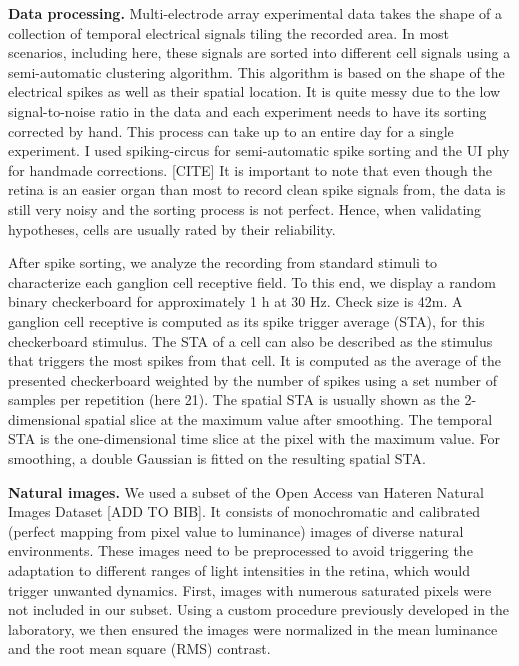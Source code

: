 \textbf{Data processing.}
Multi-electrode array experimental data takes the shape of a collection of
temporal electrical signals tiling the recorded area.
In most scenarios, including here, these signals are sorted into different cell
signals using a semi-automatic clustering algorithm. This algorithm is based on
the shape
of the electrical spikes as well as their spatial location. It is
quite messy due to the low signal-to-noise ratio in the data and each
experiment needs to have its sorting corrected by hand.
This process can take up to an
entire day for a single experiment. I used spiking-circus for semi-automatic
spike sorting and the UI phy for handmade corrections. [CITE]
It is important to note that even though the retina is an easier organ than
most to record clean spike signals from, the data is still very noisy and the
sorting process is not perfect. Hence, when validating hypotheses, cells are
usually rated by their reliability.

After spike sorting, we analyze the recording from standard stimuli to
characterize each
ganglion cell receptive field. To this end, we display a random binary
checkerboard for approximately 1 h at 30 Hz. Check size is 42\textmu m. A
ganglion cell receptive is computed as its spike trigger average (STA), for
this checkerboard stimulus. The STA of a cell can also be described as the
stimulus that triggers the most spikes from that cell. It is computed as the
average of the presented checkerboard weighted by the number of spikes using a
set number of samples per repetition (here 21). The spatial STA is usually
shown as the 2-dimensional spatial slice at the maximum value after smoothing.
The temporal STA is the one-dimensional time slice at the pixel with the maximum
value. For smoothing, a double Gaussian is fitted on the resulting spatial
STA.


\textbf{Natural images.}
We used a subset of the Open Access van Hateren Natural Images Dataset [ADD TO
        BIB]. It consists of monochromatic and calibrated (perfect mapping from
pixel
value to luminance) images of diverse natural environments. These images need
to
be preprocessed to avoid triggering the adaptation to different ranges of light
intensities in the retina, which would trigger unwanted
dynamics. First, images with numerous saturated pixels were not included in our
subset. Using a custom procedure previously developed in the laboratory, we
then
ensured the images were normalized in the mean luminance and the root mean
square (RMS) contrast.

